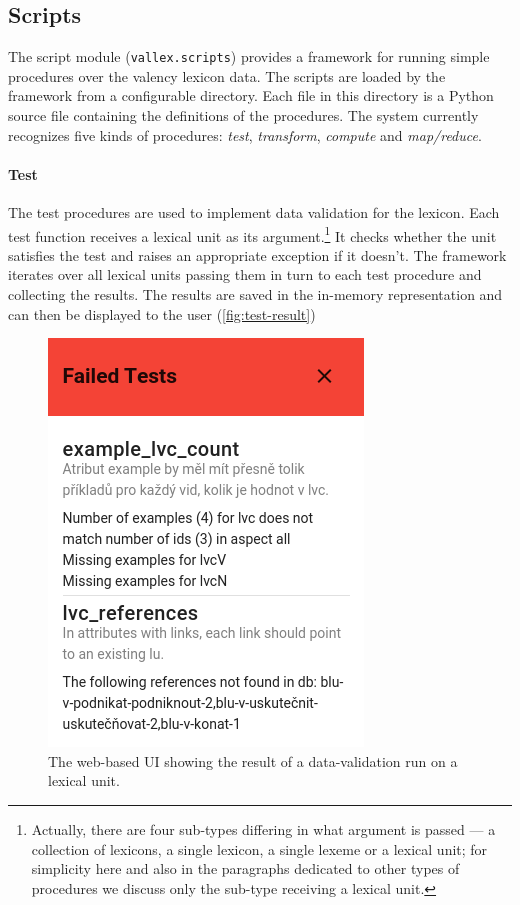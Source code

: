 \documentclass[10pt, a4paper]{article}
\newcommand{\py}[1]{{\tt #1}}
\begin{document}
\subsection{Scripts}
The script module (\py{vallex.scripts}) provides a framework for running simple procedures over the
valency lexicon data. The scripts are loaded by the framework from a configurable directory. Each
file in this directory is a Python source file containing the definitions of the procedures.
The system currently recognizes five kinds of procedures: \emph{test}, \emph{transform}, \emph{compute} and \emph{map/reduce}.

\paragraph{Test} The test procedures are used to implement data validation for the lexicon. Each test
function receives a lexical unit as its argument.\footnote{Actually, there are four sub-types differing in what
argument is passed --- a collection of lexicons, a single lexicon, a single lexeme or a lexical unit;
for simplicity here and also in the paragraphs dedicated to other types of procedures we discuss only the sub-type receiving a lexical unit.}
It checks whether the unit satisfies the test and raises an appropriate exception if it doesn't. The framework
iterates over all lexical units passing them in turn to each test procedure and collecting the results. The
results are saved in the in-memory representation and can then be displayed to the user (\autoref{fig:test-result})
\begin{figure}
    \includegraphics[width=0.8\hsize]{images/test-result.png}
    \caption{\label{fig:test-result}The web-based UI showing the result of a data-validation run on a lexical unit.}
\end{figure}
\end{document}
